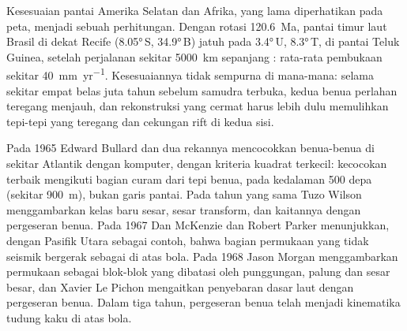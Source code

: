 \begin{omfigure}
\par{}
\label{fig:b1:plate-kinematics:south-atlantic}
\end{omfigure}

Kesesuaian pantai Amerika Selatan dan Afrika, yang lama diperhatikan pada peta, menjadi sebuah perhitungan. Dengan rotasi \qty{120.6}{Ma}, pantai timur laut Brasil di dekat Recife (\ang{8.05}\,S, \ang{34.9}\,B) jatuh pada \ang{3.4}\,U, \ang{8.3}\,T, di pantai Teluk Guinea, setelah perjalanan sekitar \qty{5000}{km} sepanjang : rata-rata pembukaan sekitar \qty{40}{mm.yr^{-1}}. Kesesuaiannya tidak sempurna di mana-mana: selama sekitar empat belas juta tahun sebelum samudra terbuka, kedua benua perlahan teregang menjauh, dan rekonstruksi yang cermat harus lebih dulu memulihkan tepi-tepi yang teregang dan cekungan rift di kedua sisi.

\begin{history}
Pada 1965 Edward Bullard dan dua rekannya mencocokkan benua-benua di sekitar Atlantik dengan komputer, dengan kriteria kuadrat terkecil: kecocokan terbaik mengikuti bagian curam dari tepi benua, pada kedalaman 500 depa (sekitar \qty{900}{m}), bukan garis pantai. Pada tahun yang sama Tuzo Wilson menggambarkan kelas baru sesar, sesar transform, dan kaitannya dengan pergeseran benua. Pada 1967 Dan McKenzie dan Robert Parker menunjukkan, dengan Pasifik Utara sebagai contoh, bahwa bagian permukaan yang tidak seismik bergerak sebagai  di atas bola. Pada 1968 Jason Morgan menggambarkan permukaan sebagai blok-blok  yang dibatasi oleh punggungan, palung dan sesar besar, dan Xavier Le Pichon mengaitkan penyebaran dasar laut dengan pergeseran benua. Dalam tiga tahun, pergeseran benua telah menjadi kinematika tudung kaku di atas bola.
\end{history}

